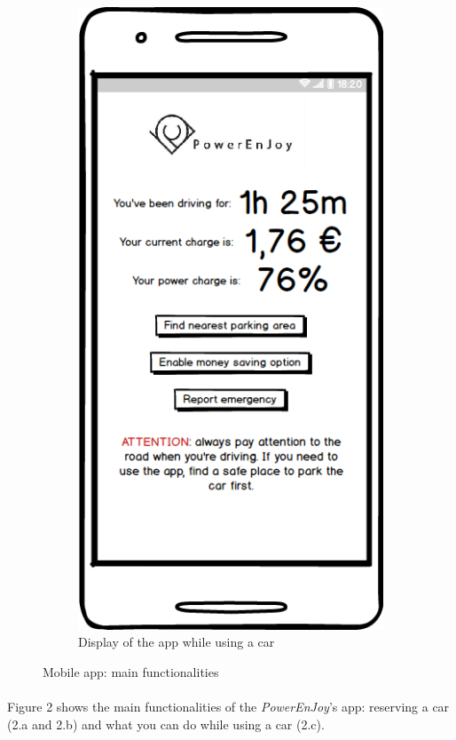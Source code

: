 \begin{figure}[h]
\begin{subfigure}{0.3\paperwidth}
			\includegraphics[scale=0.35]{img/mockups/User_driving.png}
			\caption{Display of the app while using a car}
			\label{fig:subim3}
		\end{subfigure}
 		
		
		\caption{Mobile app: main functionalities}
		\label{fig:image2}
	\end{figure}
	
	\paragraph{} Figure 2 shows the main functionalities of the \textit{PowerEnJoy}'s app: reserving a car (2.a and 2.b) and what you can do while using a car (2.c). 
	
